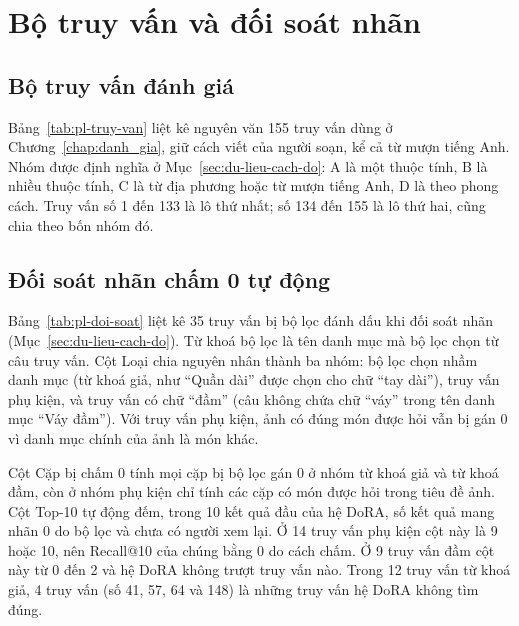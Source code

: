 \chapter{Bộ truy vấn và đối soát nhãn}
\label{app:chung}

\section{Bộ truy vấn đánh giá}
\label{app:truy-van}

Bảng~\ref{tab:pl-truy-van} liệt kê nguyên văn 155 truy vấn dùng ở Chương~\ref{chap:danh_gia}, giữ cách viết của người soạn, kể cả từ mượn tiếng Anh. Nhóm được định nghĩa ở Mục~\ref{sec:du-lieu-cach-do}: A là một thuộc tính, B là nhiều thuộc tính, C là từ địa phương hoặc từ mượn tiếng Anh, D là theo phong cách. Truy vấn số 1 đến 133 là lô thứ nhất; số 134 đến 155 là lô thứ hai, cũng chia theo bốn nhóm đó.



\section{Đối soát nhãn chấm 0 tự động}
\label{app:doi-soat}

Bảng~\ref{tab:pl-doi-soat} liệt kê 35 truy vấn bị bộ lọc đánh dấu khi đối soát nhãn (Mục~\ref{sec:du-lieu-cach-do}). Từ khoá bộ lọc là tên danh mục mà bộ lọc chọn từ câu truy vấn. Cột Loại chia nguyên nhân thành ba nhóm: bộ lọc chọn nhầm danh mục (từ khoá giả, như ``Quần dài'' được chọn cho chữ ``tay dài''), truy vấn phụ kiện, và truy vấn có chữ ``đầm'' (câu không chứa chữ ``váy'' trong tên danh mục ``Váy đầm''). Với truy vấn phụ kiện, ảnh có đúng món được hỏi vẫn bị gán 0 vì danh mục chính của ảnh là món khác.

Cột Cặp bị chấm 0 tính mọi cặp bị bộ lọc gán 0 ở nhóm từ khoá giả và từ khoá đầm, còn ở nhóm phụ kiện chỉ tính các cặp có món được hỏi trong tiêu đề ảnh. Cột Top-10 tự động đếm, trong 10 kết quả đầu của hệ DoRA, số kết quả mang nhãn 0 do bộ lọc và chưa có người xem lại. Ở 14 truy vấn phụ kiện cột này là 9 hoặc 10, nên Recall@10 của chúng bằng 0 do cách chấm. Ở 9 truy vấn đầm cột này từ 0 đến 2 và hệ DoRA không trượt truy vấn nào. Trong 12 truy vấn từ khoá giả, 4 truy vấn (số 41, 57, 64 và 148) là những truy vấn hệ DoRA không tìm đúng.


